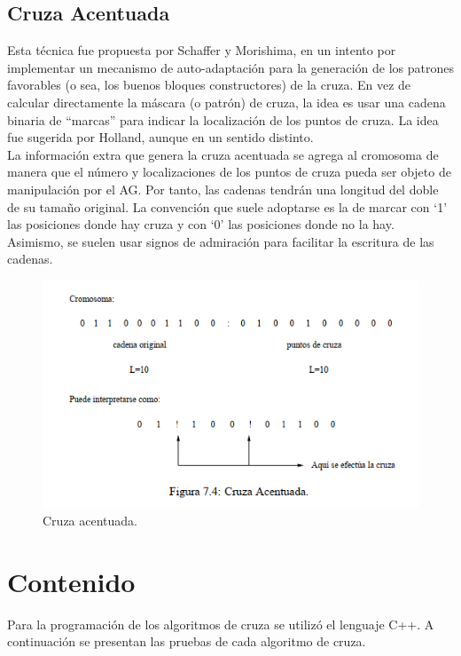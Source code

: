 \documentclass[11pt,letterpaper]{article}
\begin{document}
\subsection*{Cruza Acentuada}

Esta técnica fue propuesta por Schaffer y Morishima, en un intento por
implementar un mecanismo de auto-adaptación para la generación de los patrones
favorables (o sea, los buenos bloques constructores) de la cruza.
En vez de calcular directamente la máscara (o patrón) de cruza, la idea es usar
una cadena binaria de “marcas” para indicar la localización de los puntos de cruza.
La idea fue sugerida por Holland, aunque en un sentido distinto.\\

La información extra que genera la cruza acentuada se agrega al cromosoma
de manera que el número y localizaciones de los puntos de cruza pueda ser objeto
de manipulación por el AG.
Por tanto, las cadenas tendrán una longitud del doble de su tamaño original.
La convención que suele adoptarse es la de marcar con ‘1’ las posiciones
donde hay cruza y con ‘0’ las posiciones donde no la hay.
Asimismo, se suelen usar signos de admiración para facilitar la escritura de
las cadenas.

\begin{figure}[H]
	\centering
	\includegraphics[scale = 0.7]{images/ca}
	\caption{Cruza acentuada.}
\end{figure}

\section*{Contenido}

Para la programación de los algoritmos de cruza se utilizó el lenguaje C++. A continuación se presentan las pruebas de cada algoritmo de cruza.
\end{document}
